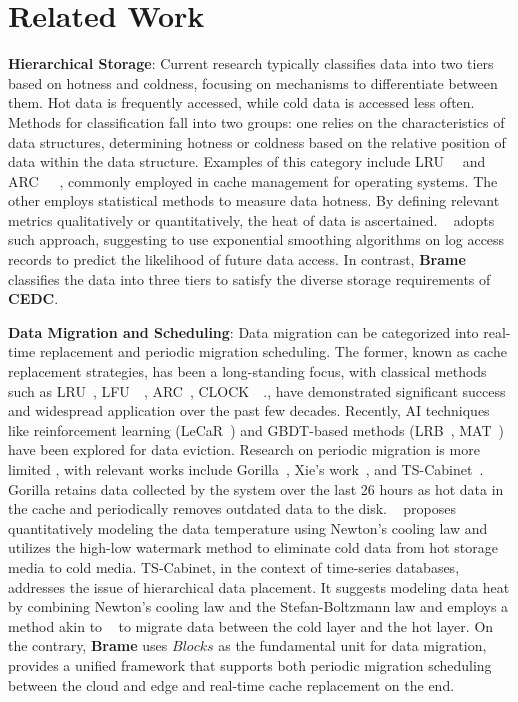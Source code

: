 \section{Related Work}
\label{sec:rel}

\parindent=0pt
\textbf{Hierarchical Storage}: Current research typically classifies data into two tiers based on hotness and coldness, focusing on mechanisms to differentiate between them. Hot data is frequently accessed, while cold data is accessed less often. Methods for classification fall into two groups: one relies on the characteristics of data structures, determining hotness or coldness based on the relative position of data within the data structure. Examples of this category include LRU~\cite{Chang2002AnAS}~\cite{ONeil1993TheLP} and ARC~\cite{MegiddoProceedingsOF}~\cite{Jiang2005DULOAE}~\cite{Cheng2015AMCAA}, commonly employed in cache management for operating systems. The other employs statistical methods to measure data hotness. By defining relevant metrics qualitatively or quantitatively, the heat of data is ascertained. ~\cite{Levandoski2013IdentifyingHA} adopts such approach, suggesting to use exponential smoothing algorithms on log access records to predict the likelihood of future data access.
In contrast, \textbf{Brame} classifies the data into three tiers to satisfy the diverse storage requirements of \textbf{CEDC}.

\parindent=0pt
\textbf{Data Migration and Scheduling}: Data migration can be categorized into real-time replacement and periodic migration scheduling. The former, known as cache replacement strategies, has been a long-standing focus, with classical methods such as LRU~\cite{Chang2002AnAS}, LFU~\cite{Karakostas2002ExploitationOD}~\cite{Jayarekha2010AnAD}, ARC~\cite{MegiddoProceedingsOF}, CLOCK~\cite{Jiang2005CLOCKProAE}~\cite{Lee2015MCLOCKMP}., have demonstrated significant success and widespread application over the past few decades. Recently, AI techniques like reinforcement learning (LeCaR~\cite{Vietri2018DrivingCR}) and GBDT-based methods (LRB~\cite{Song2020LearningRB}, MAT~\cite{Yang2023ALC}) have been explored for data eviction. Research on periodic migration is more limited , with relevant works include Gorilla~\cite{Pelkonen2015GorillaAF}, Xie's work~\cite{Xie2019}, and TS-Cabinet~\cite{Cui2023TSCabinetHS}. Gorilla retains data collected by the system over the last 26 hours as hot data in the cache and periodically removes outdated data to the disk. ~\cite{Xie2019} proposes quantitatively modeling the data temperature using Newton's cooling law and utilizes the high-low watermark method to eliminate cold data from hot storage media to cold media. TS-Cabinet, in the context of time-series databases, addresses the issue of hierarchical data placement. It suggests modeling data heat by combining Newton's cooling law and the Stefan-Boltzmann law and employs a method akin to ~\cite{Xie2019} to migrate data between the cold layer and the hot layer.
On the contrary, \textbf{Brame} uses $Blocks$ as the fundamental unit for data migration, provides a unified framework that supports both periodic migration scheduling between the cloud and edge and real-time cache replacement on the end.

